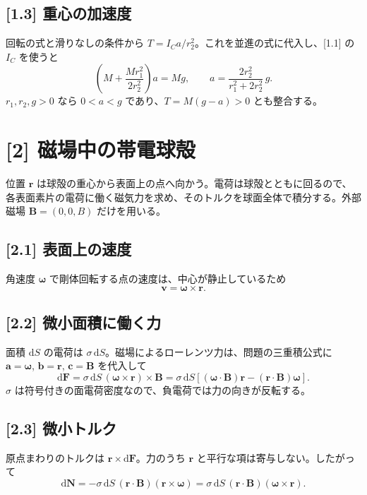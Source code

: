 \documentclass[11pt,a4paper]{article}
\begin{document}
\subsection*{[1.3] 重心の加速度}
回転の式と滑りなしの条件から $T=I_Ca/r_2^2$。これを並進の式に代入し、[1.1] の $I_C$ を使うと
\[
\left(M+\frac{Mr_1^2}{2r_2^2}\right)a=Mg,
\qquad
\boxed{a=\frac{2r_2^2}{r_1^2+2r_2^2}\,g}.
\]
$r_1,r_2,g>0$ なら $0<a<g$ であり、$T=M(g-a)>0$ とも整合する。

\section*{[2] 磁場中の帯電球殻}
位置 $\boldsymbol r$ は球殻の重心から表面上の点へ向かう。電荷は球殻とともに回るので、各表面素片の電荷に働く磁気力を求め、そのトルクを球面全体で積分する。外部磁場 $\boldsymbol B=(0,0,B)$ だけを用いる。

\subsection*{[2.1] 表面上の速度}
角速度 $\boldsymbol\omega$ で剛体回転する点の速度は、中心が静止しているため
\[
\boxed{\boldsymbol v=\boldsymbol\omega\times\boldsymbol r}.
\]

\subsection*{[2.2] 微小面積に働く力}
面積 $\mathrm dS$ の電荷は $\sigma\,\mathrm dS$。磁場によるローレンツ力は、問題の三重積公式に $\boldsymbol a=\boldsymbol\omega$, $\boldsymbol b=\boldsymbol r$, $\boldsymbol c=\boldsymbol B$ を代入して
\[
\boxed{\mathrm d\boldsymbol F
=\sigma\,\mathrm dS\,(\boldsymbol\omega\times\boldsymbol r)\times\boldsymbol B
=\sigma\,\mathrm dS\left[(\boldsymbol\omega\cdot\boldsymbol B)\boldsymbol r
-(\boldsymbol r\cdot\boldsymbol B)\boldsymbol\omega\right]}.
\]
$\sigma$ は符号付きの面電荷密度なので、負電荷では力の向きが反転する。

\subsection*{[2.3] 微小トルク}
原点まわりのトルクは $\boldsymbol r\times\mathrm d\boldsymbol F$。力のうち $\boldsymbol r$ と平行な項は寄与しない。したがって
\[
\boxed{\mathrm d\boldsymbol N
=-\sigma\,\mathrm dS\,(\boldsymbol r\cdot\boldsymbol B)
   (\boldsymbol r\times\boldsymbol\omega)
=\sigma\,\mathrm dS\,(\boldsymbol r\cdot\boldsymbol B)
   (\boldsymbol\omega\times\boldsymbol r)}.
\]
\end{document}
